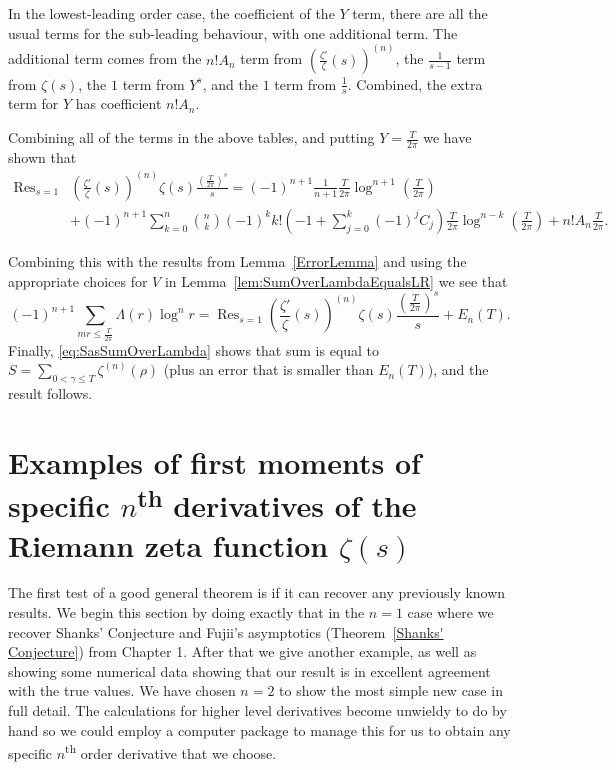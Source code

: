 \documentclass[12pt,a4paper,reqno]{amsart}
\DeclareMathOperator*{\Res}{Res}
\theoremstyle{remark}
\numberwithin{equation}{section}
\begin{document}
In the lowest-leading order case, the coefficient of the $Y$ term, there are all the usual terms for the sub-leading behaviour, with one additional term. The additional term comes from the $n! A_n$ term from $\left( \frac{\zeta'}{\zeta}(s) \right)^{(n)}$, the $\frac{1}{s-1}$ term from $\zeta (s)$, the $1$ term from $Y^s$, and the $1$ term from $\frac{1}{s}$. Combined, the extra term for $Y$ has coefficient $n! A_n$.

Combining all of the terms in the above tables, and putting $Y=\frac{T}{2\pi}$ we have shown that
\begin{align*}
\Res_{s=1}& \left( \frac{\zeta'}{\zeta}(s) \right)^{(n)} \zeta(s) \frac{\left(\frac{T}{2\pi}\right)^s}{s} =
(-1)^{n+1} \frac{1}{n+1} \frac{T}{2 \pi} \log^{n+1} \left( \frac{T}{2 \pi} \right)   \\
&+ (-1)^{n+1} \sum_{k=0}^n \binom{n}{k}  (-1)^ {k}  k! \left(-1 + \sum_{j=0}^k (-1)^j C_j \right) \frac{T}{2 \pi} \log^{n-k} \left( \frac{T}{2 \pi} \right)  +  n! A_n\frac{T}{2 \pi}.
\end{align*}

Combining this with the results from Lemma~\ref{ErrorLemma} and using the appropriate choices for $V$ in Lemma~\ref{lem:SumOverLambdaEqualsLR} we see that
\[
(-1)^{n+1} \sum_{m r \leq \frac{T}{2 \pi}} \Lambda (r) \log ^n r = \Res_{s=1} \left( \frac{\zeta'}{\zeta}(s) \right)^{(n)} \zeta(s) \frac{\left(\frac{T}{2\pi}\right)^s}{s} + E_n(T).
\]
Finally, \eqref{eq:SasSumOverLambda} shows that sum is equal to $S= \sum_{0 < \gamma \leq T} \zeta ^{(n)} (\rho)$ (plus an error that is smaller than $E_n(T)$), and the result follows.



\section{Examples of first moments of specific $n$\textsuperscript{th} derivatives of the Riemann zeta function $\zeta (s)$}\label{sect:9}
The first test of a good general theorem is if it can recover any previously known results. We begin this section by doing exactly that in the $n=1$ case where we recover Shanks' Conjecture and Fujii's asymptotics (Theorem~\ref{Shanks' Conjecture}) from Chapter 1. After that we give another example, as well as showing some numerical data showing that our result is in excellent agreement with the true values. We have chosen $n=2$ to show the most simple new case in full detail. The calculations for higher level derivatives become unwieldy to do by hand so we could employ a computer package to manage this for us to obtain any specific $n$\textsuperscript{th} order derivative that we choose.
\end{document}
